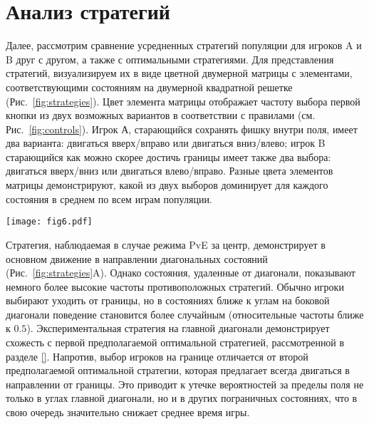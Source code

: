 \section{Анализ стратегий}\label{sec:ch3/sec5}

Далее, рассмотрим сравнение усредненных стратегий популяции для игроков A и B друг с другом, а также с оптимальными стратегиями. 
Для представления стратегий, визуализируем их в виде цветной двумерной матрицы с элементами, 
соответствующими состояниям на двумерной квадратной решетке (Рис.~\cref{fig:strategies}). 
Цвет элемента матрицы отображает частоту выбора первой кнопки из двух возможных вариантов в соответствии с правилами (см. Рис.~\cref{fig:controls}). 
Игрок А, старающийся сохранять фишку внутри поля, имеет два варианта: двигаться вверх/вправо или двигаться вниз/влево; 
игрок B старающийся как можно скорее достичь границы имеет также два выбора: двигаться вверх/вниз или двигаться влево/вправо. 
Разные цвета элементов матрицы демонстрируют, какой из двух выборов доминирует для каждого состояния в среднем по всем играм популяции.

\begin{figure*}[t]
    \begin{center}
    \texttt{[image: fig6.pdf]}
    \caption{
        Визуализация средних популяционных стратегий для разных режимов, полученных в эксперименте. 
        Цвет ячеек отображает частоту выбора первой чистой стратегии: для игры за центр (A, B, C) и для игры за границу (D, E, F).
    }  
    \label{fig:strategies}
    \end{center}
\end{figure*}

Стратегия, наблюдаемая в случае режима PvE за центр, демонстрирует в основном движение в направлении диагональных состояний (Рис.~\cref{fig:strategies}A). 
Однако состояния, удаленные от диагонали, показывают немного более высокие частоты противоположных стратегий. 
Обычно игроки выбирают уходить от границы, но в состояниях ближе к углам на боковой диагонали поведение становится более случайным 
(относительные частоты ближе к $0.5$). Экспериментальная стратегия на главной диагонали демонстрирует схожесть с первой предполагаемой оптимальной стратегией, 
рассмотренной в разделе \cref{}. Напротив, выбор игроков на границе отличается от второй предполагаемой оптимальной стратегии, 
которая предлагает всегда двигаться в направлении от границы. Это приводит к утечке вероятностей за пределы поля не только в углах главной диагонали, 
но и в других пограничных состояниях, что в свою очередь значительно снижает среднее время игры. 

